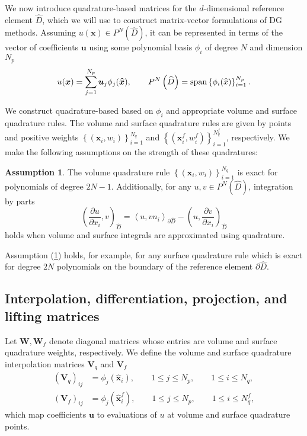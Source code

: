 \documentclass[preprint,10pt]{article}
\theoremstyle{definition}
\theoremstyle{lemma}
\theoremstyle{theorem}
\theoremstyle{assumption}
\newtheorem{assumption}{Assumption}
\renewcommand{\hat}{\widehat}
\newcommand{\pd}[2]{\frac{\partial#1}{\partial#2}}
\newcommand{\LRp}[1]{\left( #1 \right)}
\newcommand{\LRa}[1]{\left\langle #1 \right\rangle}
\newcommand{\LRc}[1]{\left\{ #1 \right\}}
\newcommand{\note}[1]{{\color{blue}{#1}}}
\begin{document}
{We now introduce quadrature-based matrices for the $d$-dimensional reference element $\widehat{D}$, which we will use to construct matrix-vector formulations of DG methods.   Assuming $u(\bm{x}) \in P^N\LRp{\widehat{D}}$, it can be represented in terms of the vector of coefficients $\bm{u}$ using some polynomial basis $\phi_i$ of degree $N$ and dimension $N_p$ 
\[
u(\bm{x}) = \sum_{j=1}^{N_p}\bm{u}_j \phi_j(\widehat{\bm{x}}), \qquad P^N\LRp{\widehat{D}} = {\rm span}\LRc{\phi_i(\widehat{x})}_{i=1}^{N_p}.
\]

We construct quadrature-based based on $\phi_i$ and appropriate volume and surface quadrature rules.  The volume and surface quadrature rules are given by points and positive weights $\LRc{(\bm{x}_i, w_i)}_{i=1}^{N_q}$ and $\LRc{(\bm{x}^f_i, w^f_i)}_{i=1}^{N^f_q}$, respectively.  We make the following assumptions on the strength of these quadratures: %
\begin{assumption}
The volume quadrature rule  $\LRc{(\bm{x}_i, w_i)}_{i=1}^{N_q}$ is exact for polynomials of degree $2N-1$.  Additionally, 
for any $u, v \in P^N\LRp{\hat{D}}$, integration by parts 
\[
\LRp{\pd{u}{x_i},v}_{\hat{D}} = \LRa{u,vn_i}_{\partial \hat{D}} - \LRp{u,\pd{v}{x_i}}_{\hat{D}}
\]
holds when volume and surface integrals are approximated using quadrature.
\label{ass:quad}
\end{assumption}
Assumption (\ref{ass:quad}) holds, for example, for any surface quadrature rule which is exact for degree $2N$ polynomials on the boundary of the reference element $\partial \hat{D}$.  


\subsection{{Interpolation, differentiation, projection, and lifting matrices}}
\label{sec:matrix}


Let $\bm{W}, \bm{W}_f$ denote diagonal matrices whose entries are volume and surface quadrature weights, respectively.  We define the volume and surface quadrature interpolation matrices $\bm{V}_q$ and $\bm{V}_f$
\begin{align}
\LRp{\bm{V}_q}_{ij} &= \phi_j(\hat{\bm{x}}_i), \qquad 1 \leq j \leq N_p, \qquad 1 \leq i \leq N_q, \nonumber\\
\LRp{\bm{V}_f}_{ij} &= \phi_j(\hat{\bm{x}}^f_i), \qquad 1 \leq j \leq N_p, \qquad 1 \leq i \leq N^f_q,\label{eq:qinterp}
\end{align}
which map coefficients $\bm{u}$ to evaluations of $u$ at volume and surface quadrature points.  

}
\end{document}
